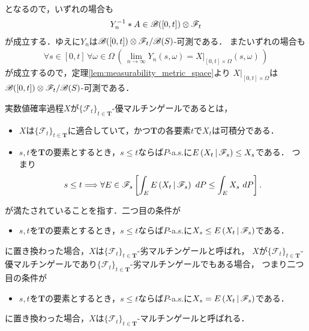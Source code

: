 \begin{sketch}
\begin{description}
\begin{align}
				\end{align}
				となるので，いずれの場合も
				\begin{align}
					Y_n^{-1} \ast A \in \mathscr{B}([0,t]) \otimes \mathscr{F}_t
				\end{align}
				が成立する．ゆえに$Y_n$は$\mathscr{B}([0,t]) \otimes \mathscr{F}_t/\mathscr{B}(S)$-可測である．
				またいずれの場合も
				\begin{align}
					\forall s \in [0,t]\, \forall \omega \in \Omega\,
					\left(\, \lim_{n \to \infty} Y_n(s,\omega) = X|_{[0,t] \times \Omega}(s,\omega)\, \right)
				\end{align}
				が成立するので，定理\ref{lem:measurability_metric_space}より
				$X|_{[0,t] \times \Omega}$は$\mathscr{B}([0,t]) \otimes \mathscr{F}_t/\mathscr{B}(S)$-可測である．
				\QED
		\end{description}
		
	\end{sketch}
	
	実数値確率過程$X$が$\{\mathscr{F}_t\}_{t \in \mathbf{T}}$-優マルチンゲールであるとは，
	\begin{itemize}
		\item $X$は$\{\mathscr{F}_t\}_{t \in \mathbf{T}}$に適合していて，かつ$\mathbf{T}$の各要素$t$で$X_t$は可積分である．
		\item $s,t$を$\mathbf{T}$の要素とするとき，$s \leq t$ならば$P$-a.s.に$E\left( X_t \, \middle|\, \mathscr{F}_s \right) \leq X_s$である．
			つまり
			\begin{align}
				s \leq t \Longrightarrow 
				\forall E \in \mathscr{F}_s \left[ \int_E E\left( X_t \, \middle|\, \mathscr{F}_s \right)\ dP \leq \int_E X_s\ dP\right].
			\end{align}
	\end{itemize}
	が満たされていることを指す．二つ目の条件が
	\begin{itemize}
		\item $s,t$を$\mathbf{T}$の要素とするとき，$s \leq t$ならば$P$-a.s.に$X_s \leq E\left( X_t \, \middle|\, \mathscr{F}_s \right)$である．
	\end{itemize}
	に置き換わった場合，$X$は$\{\mathscr{F}_t\}_{t \in \mathbf{T}}$-劣マルチンゲールと呼ばれ，
	$X$が$\{\mathscr{F}_t\}_{t \in \mathbf{T}}$-優マルチンゲールであり$\{\mathscr{F}_t\}_{t \in \mathbf{T}}$-劣マルチンゲールでもある場合，
	つまり二つ目の条件が
	\begin{itemize}
		\item $s,t$を$\mathbf{T}$の要素とするとき，$s \leq t$ならば$P$-a.s.に$X_s = E\left( X_t \, \middle|\, \mathscr{F}_s \right)$である．
	\end{itemize}
	に置き換わった場合，$X$は$\{\mathscr{F}_t\}_{t \in \mathbf{T}}$-マルチンゲールと呼ばれる．
	
